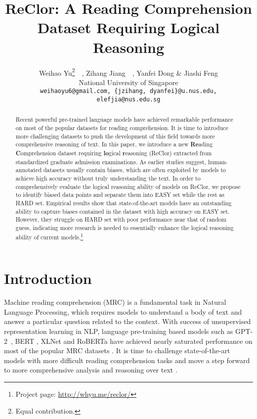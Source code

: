 \documentclass{article} \usepackage{iclr2020_conference,times}
\title{ReClor: A Reading Comprehension Dataset Requiring Logical Reasoning}
\author{Weihao Yu\thanks{Equal contribution.}~~, Zihang Jiang\samethanks~~, Yanfei Dong \& Jiashi Feng  \\
	National University of Singapore\\
	\texttt{weihaoyu6@gmail.com, \{jzihang, dyanfei\}@u.nus.edu,}\\ 
	\texttt{elefjia@nus.edu.sg} \\
}
\begin{document}
	
	
\maketitle
\begin{abstract}
Recent powerful pre-trained language models have achieved remarkable performance on most of the popular datasets for reading comprehension. It is time to introduce more challenging datasets to push the development of this field towards more comprehensive reasoning of text. In this paper, we introduce a  new \textbf{Re}ading \textbf{C}omprehension dataset requiring \textbf{lo}gical \textbf{r}easoning (ReClor) extracted from standardized graduate admission examinations.
As earlier studies suggest, human-annotated datasets usually contain biases, which are often exploited by models to achieve high accuracy without truly understanding the text. In order to comprehensively evaluate the logical reasoning ability of models on ReClor, we propose to identify biased data points and separate them into EASY set while the rest as HARD set. Empirical results show that state-of-the-art models have an outstanding ability to capture biases contained in the dataset with high accuracy on EASY set. However, they struggle on HARD set with poor performance near that of random guess,  indicating more research is needed to essentially enhance the logical reasoning ability of current models.\footnote{Project page: \url{http://whyu.me/reclor/}}
        
        
\end{abstract}
\section{Introduction}
{Machine reading comprehension} (MRC) is a fundamental task in Natural Language Processing, which requires models to understand a body of text and answer a particular question related to the context. With success of unsupervised representation learning in NLP, language pre-training based models such as GPT-2~\citep{radford2019language}, BERT \citep{devlin2019bert}, XLNet \citep{yang2019xlnet} and RoBERTa \citep{liu2019roberta} have achieved  nearly saturated performance on most of the popular MRC datasets \citep{rajpurkar2016squad,lai2017race, rajpurkar2018know, wang2018glue}. It is time to challenge state-of-the-art models with more difficult reading comprehension tasks and move a step forward to more comprehensive analysis and reasoning over text \citep{dua2019drop}.
	
\end{document}
